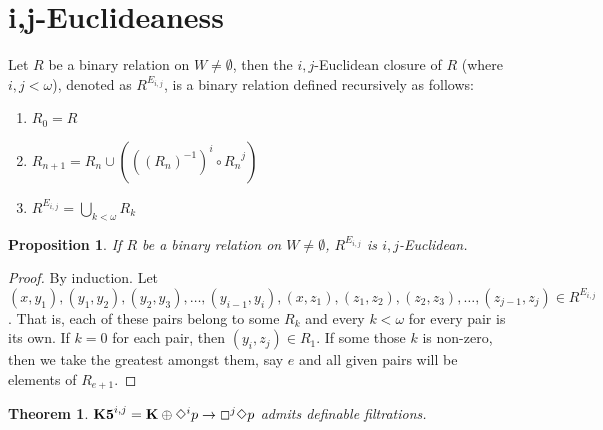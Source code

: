 \documentclass[a4paper]{article}
\theoremstyle{defin}
\theoremstyle{theorem}
\newtheorem{theorem}{Theorem}
\theoremstyle{prop}
\newtheorem{prop}{Proposition}
\theoremstyle{lemma}
\theoremstyle{fact}
\theoremstyle{ex}
\theoremstyle{col}
\theoremstyle{claim}
\begin{document}
\section{i,j-Euclideaness}

Let $R$ be a binary relation on $W \neq \emptyset$, then the $i,j$-Euclidean closure of $R$ (where $i, j < \omega$), denoted as $R^{E_{i,j}}$, is a binary relation defined recursively as follows:
\begin{enumerate}
  \item $R_0 = R$
  \item $R_{n + 1} = R_n \cup (((R_n)^{-1})^i \circ {R_n}^j)$
  \item $R^{E_{i,j}} = \bigcup \limits_{k < \omega} R_k$
\end{enumerate}

\begin{prop}
  If $R$ be a binary relation on $W \neq \emptyset$, $R^{E_{i,j}}$ is $i,j$-Euclidean.
\end{prop}
\begin{proof}
  By induction. Let $(x,y_1), (y_1,y_2), (y_2,y_3), \dots, (y_{i - 1},y_i), (x,z_1), (z_1,z_2), (z_2,z_3), \dots, (z_{j - 1},z_j) \in R^{E_{i,j}}$.
  That is, each of these pairs belong to some $R_k$ and every $k < \omega$ for every pair is its own.
  If $k = 0$ for each pair, then $(y_i, z_j) \in R_1$.
  If some those $k$ is non-zero, then we take the greatest amongst them, say $e$ and all given pairs will be elements of $R_{e + 1}$.
\end{proof}

\begin{theorem}
  ${\bf K5}^{i,j} = {\bf K} \oplus \Diamond^{i} p \to \Box^{j} \Diamond p$ admits definable filtrations.
\end{theorem}
\end{document}

